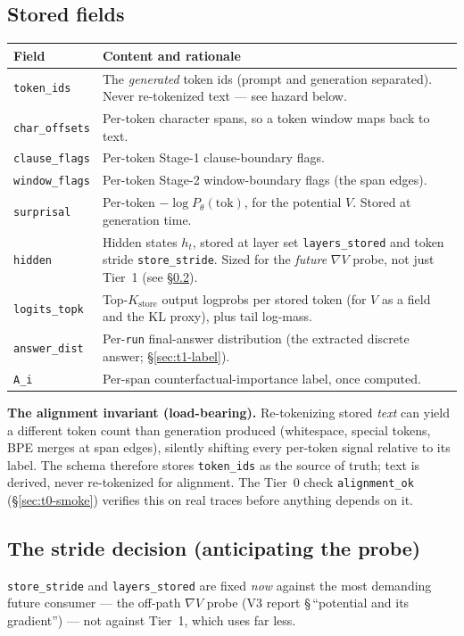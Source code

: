 \documentclass[11pt]{article}
\newcommand{\out}[1]{\texttt{#1}}      %
\newcommand{\param}[1]{\texttt{#1}}    %
\begin{document}
\subsection{Stored fields}
\begin{longtable}{@{}p{}p{}@{}}
\toprule
Field & Content and rationale \\
\midrule
\out{token\_ids} & The \emph{generated} token ids (prompt and generation
separated). Never re-tokenized text --- see hazard below. \\
\out{char\_offsets} & Per-token character spans, so a token window maps back to
text. \\
\out{clause\_flags} & Per-token Stage-1 clause-boundary flags. \\
\out{window\_flags} & Per-token Stage-2 window-boundary flags (the span edges). \\
\out{surprisal} & Per-token $-\log P_\theta(\text{tok})$, for the potential $V$.
Stored at generation time. \\
\out{hidden} & Hidden states $h_t$, stored at layer set \param{layers\_stored}
and token stride \param{store\_stride}. Sized for the \emph{future} $\nabla V$
probe, not just Tier~1 (see \S\ref{sec:contract-stride}). \\
\out{logits\_topk} & Top-$K_{\text{store}}$ output logprobs per stored token (for
$V$ as a field and the KL proxy), plus tail log-mass. \\
\out{answer\_dist} & Per-\out{run} final-answer distribution (the extracted
discrete answer; \S\ref{sec:t1-label}). \\
\out{A\_i} & Per-span counterfactual-importance label, once computed. \\
\bottomrule
\end{longtable}

\begin{honest}
\textbf{The alignment invariant (load-bearing).} Re-tokenizing stored \emph{text}
can yield a different token count than generation produced (whitespace, special
tokens, BPE merges at span edges), silently shifting every per-token signal
relative to its label. The schema therefore stores \out{token\_ids} as the source
of truth; text is derived, never re-tokenized for alignment. The Tier~0 check
\out{alignment\_ok} (\S\ref{sec:t0-smoke}) verifies this on real traces before
anything depends on it.
\end{honest}

\subsection{The stride decision (anticipating the probe)}
\label{sec:contract-stride}
\param{store\_stride} and \param{layers\_stored} are fixed \emph{now} against the
most demanding future consumer --- the off-path $\nabla V$ probe (V3 report
\S\,``potential and its gradient'') --- not against Tier~1, which uses far less.
\end{document}
